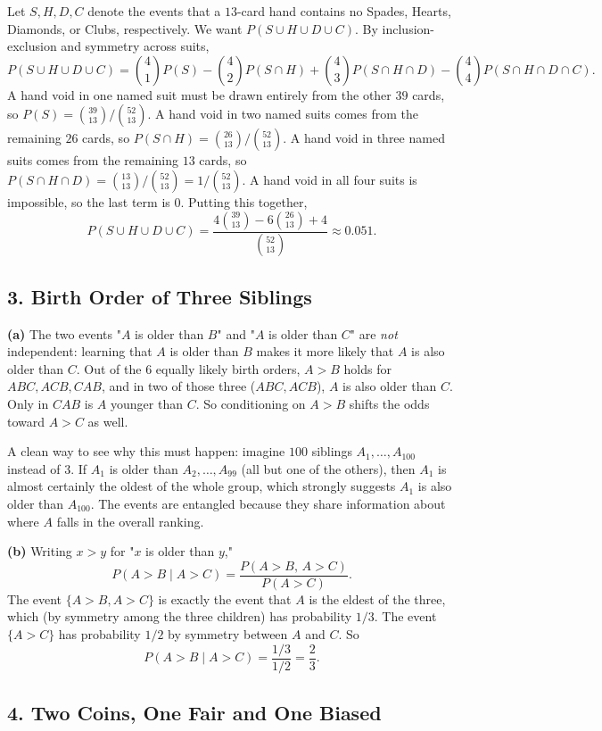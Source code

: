 \documentclass{article}
\begin{document}
Let $S,H,D,C$ denote the events that a $13$-card hand contains no Spades, Hearts, Diamonds, or Clubs, respectively. We want $P(S\cup H\cup D\cup C)$. By inclusion-exclusion and symmetry across suits,
$$
P(S\cup H\cup D\cup C) = \binom{4}{1}P(S) - \binom{4}{2}P(S\cap H) + \binom{4}{3}P(S\cap H\cap D) - \binom{4}{4}P(S\cap H\cap D\cap C).
$$
A hand void in one named suit must be drawn entirely from the other $39$ cards, so $P(S) = \binom{39}{13}/\binom{52}{13}$. A hand void in two named suits comes from the remaining $26$ cards, so $P(S\cap H)=\binom{26}{13}/\binom{52}{13}$. A hand void in three named suits comes from the remaining $13$ cards, so $P(S\cap H\cap D) = \binom{13}{13}/\binom{52}{13} = 1/\binom{52}{13}$. A hand void in all four suits is impossible, so the last term is $0$. Putting this together,
$$
P(S\cup H\cup D\cup C) = \frac{4\binom{39}{13} - 6\binom{26}{13} + 4}{\binom{52}{13}} \approx 0.051.
$$

\subsection*{3. Birth Order of Three Siblings}

\textbf{(a)} The two events "$A$ is older than $B$" and "$A$ is older than $C$" are \emph{not} independent: learning that $A$ is older than $B$ makes it more likely that $A$ is also older than $C$. Out of the $6$ equally likely birth orders, $A>B$ holds for $ABC, ACB, CAB$, and in two of those three ($ABC, ACB$), $A$ is also older than $C$. Only in $CAB$ is $A$ younger than $C$. So conditioning on $A>B$ shifts the odds toward $A>C$ as well.

A clean way to see why this must happen: imagine $100$ siblings $A_1,\dots,A_{100}$ instead of $3$. If $A_1$ is older than $A_2,\dots,A_{99}$ (all but one of the others), then $A_1$ is almost certainly the oldest of the whole group, which strongly suggests $A_1$ is also older than $A_{100}$. The events are entangled because they share information about where $A$ falls in the overall ranking.

\medskip
\textbf{(b)} Writing $x>y$ for "$x$ is older than $y$,"
$$
P(A>B \mid A>C) = \frac{P(A>B,\,A>C)}{P(A>C)}.
$$
The event $\{A>B, A>C\}$ is exactly the event that $A$ is the eldest of the three, which (by symmetry among the three children) has probability $1/3$. The event $\{A>C\}$ has probability $1/2$ by symmetry between $A$ and $C$. So
$$P(A>B\mid A>C) = \frac{1/3}{1/2} = \frac{2}{3}.$$

\subsection*{4. Two Coins, One Fair and One Biased}
\end{document}
